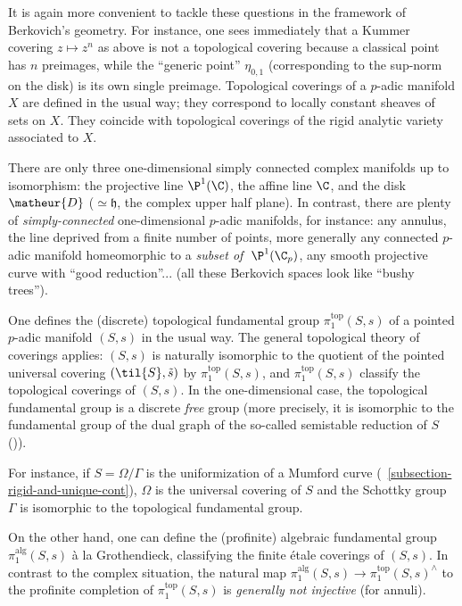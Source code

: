 \begin{para}
 It is again more convenient to tackle these questions in the framework
 of Berkovich's geometry.  For instance, one sees immediately that a
 Kummer covering $z\mapsto z^n$ as above is not a topological covering
 because a classical point has $n$ preimages, while the ``generic
 point'' $\eta_{0,1}$ (corresponding to the sup-norm on the disk) is its
 own single preimage. 
 Topological coverings of a $p$-adic manifold $X$ are defined in the
 usual way; they correspond to locally constant sheaves of sets on $X$.
 They coincide \cite[3.3.4]{staagonf} with topological coverings of the
 rigid analytic variety associated to $X$.
\end{para}

\begin{para}
 There are only three one-dimensional simply connected complex manifolds up to
 isomorphism: the projective line ${\P}^1(\C)$, the affine line $\C$, and
 the disk $\matheur{D}$ ($\simeq \mathfrak{h}$, the complex upper half
 plane). In contrast, there are plenty of \emph{simply-connected}
 one-dimensional 
 $p$-adic manifolds, for instance: any annulus, the line deprived from a
 finite number of points, more generally any connected $p$-adic manifold
 homeomorphic to a \emph{subset of} $\;{\P}^1(\C_p)$, any smooth
 projective curve with ``good reduction''... (all these Berkovich spaces
 look like ``bushy trees'').
\end{para}

\begin{para}
 One defines the (discrete) topological fundamental group
 $\pi_1^{\mathrm{top}}(S,s)$ of
 a pointed $p$-adic manifold $(S,s)$ in the usual way. The general
 topological theory of
 coverings applies: $(S,s)$ is naturally isomorphic to the quotient of the
 pointed universal
 covering $({\til{S}},{\tilde{s}})$ by $\pi_1^{\mathrm{top}}(S,s)$, and
 $\pi_1^{\mathrm{top}}(S,s)$ classify the
 topological coverings of $(S,s)$.   In the one-dimensional case, the
 topological fundamental
 group is a discrete \emph{free} group (more precisely, it is isomorphic to
 the fundamental
 group of the dual graph of the so-called semistable reduction of $S$
 (\cite[5.3]{efgonas})). 

 For instance, if $S=\Omega/\Gamma$ is the
 uniformization of a Mumford curve
 (\cf~\ref{subsection-rigid-and-unique-cont}), $\Omega$ is the universal
 covering of $S$ and the Schottky group $\Gamma$ is isomorphic to the 
 topological fundamental group.

 On the other hand, one can define the (profinite) algebraic fundamental
 group $\pi_1^{\mathrm{alg}}(S,s)$ \`a la Grothendieck, classifying the finite
 \'etale coverings of $(S,s)$. In contrast to the complex situation, the
 natural map $\pi_1^{\mathrm{alg}}(S,s) \rightarrow
 \pi_1^{\mathrm{top}}(S,s)^{\wedge}$
 to the profinite completion of $\pi_1^{\mathrm{top}}(S,s)$ is
 \emph{generally not injective} (\eg for annuli).
\end{para}

